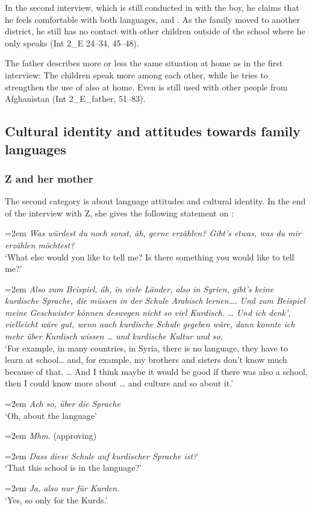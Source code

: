 \documentclass[output=paper,colorlinks,citecolor=brown]{langscibook}
\newenvironment{interview}{
  \setlength{\leftskip}{2.5em} %
  \setlength{\rightskip}{2.5em} %
  \setlength{\parindent}{0pt} %
  \vspace{\topsep} %
}{
  \vspace{\topsep} %
}
\newcommand{\speaker}[1]{%
  \noindent\hangindent=2em\makebox[1.5em][l]{#1:}\hspace{0.5em}%
}
\newcommand{\myattrib}[1]{%
    \attrib{#1}
}
\begin{document}
In the second interview, which is still conducted in  with the boy, he claims that he feels comfortable with both languages,  and . As the family moved to another district, he still has no contact with other children outside of the school where he only speaks  (Int 2\_E 24--34, 45--48).

The father describes more or less the same situation at home as in the first interview: The children speak more  among each other, while he tries to strengthen the use of  also at home. Even  is still used with other people from Afghanistan (Int 2\_E\_father, 51--83).

\subsection{Cultural identity and attitudes towards family languages}\label{ch2.5.ss.4.3}

\subsubsection{Z and her mother}\label{ch2.5.ss.4.3.1}

The second category is about language attitudes and cultural identity. In the end of the interview with Z, she gives the following statement on :

\begin{interview}\label{ch2.5.ex.23}
\speaker{I}\textit{Was würdest du noch sonst, äh, gerne erzählen? Gibt's etwas, was du mir erzählen möchtest?} \\
`What else would you like to tell me? Is there something you would like to tell me?' 

\speaker{Z}\textit{Also zum Beispiel, äh, in viele Länder, also in Syrien, gibt's keine kurdische Sprache, die müssen in der Schule Arabisch lernen…. Und zum Beispiel meine Geschwister können deswegen nicht so viel Kurdisch. … Und ich denk', vielleicht wäre gut, wenn auch kurdische Schule gegeben wäre, dann konnte ich mehr über Kurdisch wissen … und kurdische Kultur und so.} \\
`For example, in many countries, in Syria, there is no  language, they have to learn  at school… and, for example, my brothers and sisters don't know much  because of that. … And I think maybe it would be good if there was also a  school, then I could know more about  … and  culture and so about it.' 

\speaker{I}\textit{Ach so, über die Sprache}\\ 
`Oh, about the language' 

\speaker{Z}\textit{Mhm.} (approving)

\speaker{I}\textit{Dass diese Schule auf kurdischer Sprache ist?} \\
`That this school is in the  language?' 

\speaker{Z}\textit{Ja, also nur für Kurden.} \\
`Yes, so only for the Kurds.' 
\myattrib{Int 1\_Z, 320--349}
\end{interview}
\end{document}
